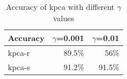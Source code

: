 \begin{table}[htb!]
  \centering
  \begin{tabular}{lrr}
    \toprule
     Accuracy & $\gamma$=0.001 & $\gamma$=0.01 \\
    \midrule
    kpca-r & 89.5\% & 56\% \\
    kpca-s & 91.2\% & 91.5\% \\
    \bottomrule
  \end{tabular}
  \caption{Accuracy of \gls{kpca} with different $\gamma$ values}
  \label{tab:gamma-values-kpca}
\end{table}